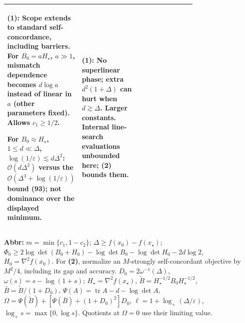 \begin{table}[tp]
\begin{threeparttable}
\begin{tabularx}{\linewidth}{@{}>{\raggedright\arraybackslash}p{0.20\linewidth}>{\raggedright\arraybackslash}p{0.32\linewidth}>{\raggedright\arraybackslash}p{0.25\linewidth}>{\raggedright\arraybackslash}X@{}}
\textbf{(1)}: Scope extends to standard self-concordance, including barriers. For $B_0=aH_\star$, $a\gg1$, mismatch dependence becomes $d\log a$ instead of linear in $a$ (other parameters fixed). Allows $c_1\geq1/2$.\par For $B_0\approx H_\star$, $1\leq d\ll\Delta$, $\log(1/\varepsilon)\lesssim d\Delta^2$: $\mathcal{O}(d\Delta^2)$ versus the $\mathcal{O}(\Delta^3+\log(1/\varepsilon))$ bound (93); not dominance over the displayed minimum. &
\textbf{(1)}: No superlinear phase; extra $d^2(1+\Delta)$ can hurt when $d\gtrsim\Delta$. Larger constants. Internal line-search evaluations unbounded here; \textbf{(2)} bounds them. \\
\bottomrule
\end{tabularx}
\begin{tablenotes}[flushleft]\footnotesize
\item[] \textbf{Abbr:} $m=\min\{c_1,1-c_2\}$; $\Delta\geq f(x_0)-f(x_\star)$; $\Phi_0\geq2\log\det(B_0+H_0)-\log\det B_0-\log\det H_0-2d\log2$, $H_0=\nabla^2f(x_0)$. For \textbf{(2)}, normalize an $M$-strongly self-concordant objective by $M^2/4$, including its gap and accuracy. $D_0=2\omega^{-1}(\Delta)$, $\omega(s)=s-\log(1+s)$; $H_\star=\nabla^2f(x_\star)$, $\widetilde B=H_\star^{-1/2}B_0H_\star^{-1/2}$, $\bar B=\widetilde B/(1+D_0)$, $\Psi(A)=\operatorname{tr}A-d-\log\det A$, $\Omega=\Psi(\widetilde B)+[\Psi(\bar B)+(1+D_0)^2]D_0$, $\ell=1+\log_+(\Delta/\varepsilon)$, $\log_+s=\max\{0,\log s\}$. Quotients at $\Omega=0$ use their limiting value.
\end{tablenotes}
\end{threeparttable}
\end{table}
\clearpage
